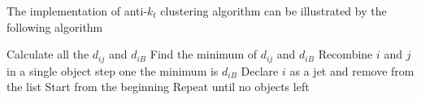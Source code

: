 %
%
%
%
%


The implementation of anti-$k_t$ clustering algorithm can be illustrated by the following algorithm 
\begin{algorithmic}
\State Calculate all the $d_{ij}$ and $d_{iB}$
\State Find the minimum of $d_{ij}$ and $d_{iB}$ 
	\State Recombine $i$ and $j$ in a single object 
	\State \Return step one
\Else \State the minimum is $d_{iB}$
	\State Declare $i$ as a jet and remove from the list
	\State Start from the beginning	
\EndIf
\State Repeat until no objects left 
\end{algorithmic} 

